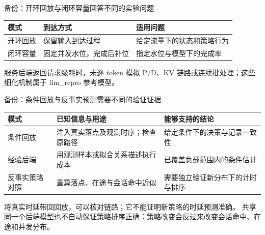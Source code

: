 \documentclass[aspectratio=169,10pt]{beamer}
\newcommand{\src}[1]{\vfill{\fontsize{6.7}{8}\selectfont\color{Muted}#1}\par}
\newcommand{\warn}[1]{\textcolor{Amber}{#1}}
\begin{document}
\begin{frame}{备份：开环回放与闭环容量回答不同的实验问题}
\begin{center}
\end{center}
\medskip
\renewcommand{\arraystretch}{1.5}
\begin{tabularx}{\textwidth}{@{}lYY@{}}
\toprule 模式 & 到达方式 & 适用问题 \\
\midrule
开环回放 & 保留输入到达过程 & 给定流量下的状态和策略行为 \\
闭环容量 & 固定并发水位，完成后补位 & 指定水位与模型下的完成率 \\
\bottomrule
\end{tabularx}
\src{服务后端返回请求级耗时，未逐 token 模拟 P/D、KV 链路或连续批处理；这些细化机制属于 llm\_repro 参考模型。}
\end{frame}

\begin{frame}{备份：条件回放与反事实预测需要不同的验证证据}
\renewcommand{\arraystretch}{1.65}
\begin{tabularx}{\textwidth}{@{}lYY@{}}
\toprule
模式 & 已知信息与用途 & 能够支持的结论 \\
\midrule
条件回放 & 注入真实落点及观测时序；检查原路径 & 给定条件下的决策与记录一致性 \\
经验后端 & 用观测样本或拟合关系描述执行成本 & 已覆盖负载范围内的条件估计 \\
反事实策略对照 & 重算落点、在途与会话命中近似 & 需要独立验证新分布下的计时与排序 \\
\bottomrule
\end{tabularx}
\medskip
\warn{将真实时延带回回放，可以核对链路；它不能证明新策略的时延预测准确。}
\src{共享同一个后端模型也不自动保证策略排序正确：策略改变会反过来改变会话命中、在途和并发分布。}
\end{frame}
\end{document}
